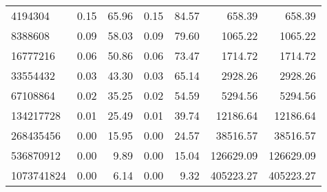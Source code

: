 \begin{tabular}{lrrrrrr}
4194304    &        0.15 &         65.96 &           0.15 &        84.57 &           658.39 &          658.39 \\
8388608    &        0.09 &         58.03 &           0.09 &        79.60 &          1065.22 &         1065.22 \\
16777216   &        0.06 &         50.86 &           0.06 &        73.47 &          1714.72 &         1714.72 \\
33554432   &        0.03 &         43.30 &           0.03 &        65.14 &          2928.26 &         2928.26 \\
67108864   &        0.02 &         35.25 &           0.02 &        54.59 &          5294.56 &         5294.56 \\
134217728  &        0.01 &         25.49 &           0.01 &        39.74 &         12186.64 &        12186.64 \\
268435456  &        0.00 &         15.95 &           0.00 &        24.57 &         38516.57 &        38516.57 \\
536870912  &        0.00 &          9.89 &           0.00 &        15.04 &        126629.09 &       126629.09 \\
1073741824 &        0.00 &          6.14 &           0.00 &         9.32 &        405223.27 &       405223.27 \\
\bottomrule
\end{tabular}
